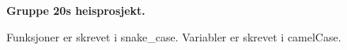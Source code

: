 {\bfseries{Gruppe 20\textquotesingle{}s heisprosjekt.}}

Funksjoner er skrevet i snake\+\_\+case. Variabler er skrevet i camel\+Case. 